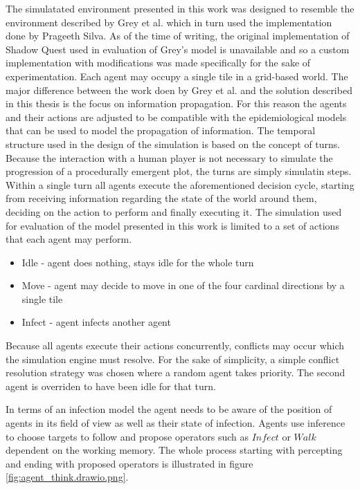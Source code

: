 \label{chapter:chapter2}

The simulatated environment presented in this work was designed to resemble the environment described by Grey et al.\cite{grey2011procedural} which in turn used the implementation done by Prageeth Silva\cite{silva2010shadow}.
As of the time of writing, the original implementation of Shadow Quest used in evaluation of Grey's model is unavailable and so a custom implementation with modifications was made specifically for the sake of experimentation.
Each agent may occupy a single tile in a grid-based world.
The major difference between the work doen by Grey et al. and the solution described in this thesis is the focus on information propagation.
For this reason the agents and their actions are adjusted to be compatible with the epidemiological models that can be used to model the propagation of information.
The temporal structure used in the design of the simulation is based on the concept of turns.
Because the interaction with a human player is not necessary to simulate the progression of a procedurally emergent plot, the turns are simply simulatin steps.
Within a single turn all agents execute the aforementioned decision cycle, starting from receiving information regarding the state of the world around them, deciding on the action to perform and finally executing it.
The simulation used for evaluation of the model presented in this work is limited to a set of actions that each agent may perform.

\begin{itemize}
    \item Idle - agent does nothing, stays idle for the whole turn
    \item Move - agent may decide to move in one of the four cardinal directions by a single tile
    \item Infect - agent infects another agent
\end{itemize}

Because all agents execute their actions concurrently, conflicts may occur which the simulation engine must resolve.
For the sake of simplicity, a simple conflict resolution strategy was chosen where a random agent takes priority.
The second agent is overriden to have been idle for that turn.

In terms of an infection model the agent needs to be aware of the position of agents in its field of view as well as their state of infection.
Agents use inference to choose targets to follow and propose operators such as $Infect$ or $Walk$ dependent on the working memory.
The whole process starting with percepting and ending with proposed operators is illustrated in figure \ref{fig:agent_think.drawio.png}.

